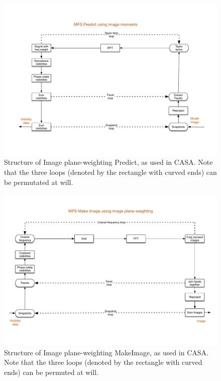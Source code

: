 \documentclass[11pt,a4paper,variablewidth]{article}
\begin{document}
\begin{figure}[htb]
  \centering
  \includegraphics[width=\textwidth]{./MSMFS_Predict_Image.pdf}
  \caption{Structure of Image plane-weighting Predict, as used in CASA. Note that the three loops (denoted by the rectangle with curved ends) can be permutated at will.}
  \label{fig:makeimageuv}
\end{figure}


\begin{figure}[htb]
  \centering
  \includegraphics[width=\textwidth]{./MSMFS_MakeImage_Image.pdf}
  \caption{Structure of Image plane-weighting MakeImage, as used in CASA. Note that the three loops (denoted by the rectangle with curved ends) can be permuted at will.}
  \label{fig:makeimageimage}
\end{figure}
\end{document}
